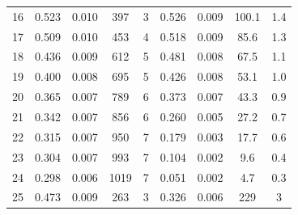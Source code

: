 \documentclass{article}
\begin{document}
{\begin{table}[H]
\begin{tabular}{@{}c|cc|cc||cc|cc@{}}
16 & 0.523  & 0.010   & 397          & 3              & 0.526 & 0.009   & 100.1        & 1.4            \\
17 & 0.509  & 0.010   & 453          & 4              & 0.518 & 0.009   & 85.6         & 1.3            \\
18 & 0.436  & 0.009   & 612          & 5              & 0.481 & 0.008   & 67.5         & 1.1            \\
19 & 0.400  & 0.008   & 695          & 5              & 0.426 & 0.008   & 53.1         & 1.0            \\
20 & 0.365  & 0.007   & 789          & 6              & 0.373 & 0.007   & 43.3         & 0.9            \\
21 & 0.342  & 0.007   & 856          & 6              & 0.260 & 0.005   & 27.2         & 0.7            \\
22 & 0.315  & 0.007   & 950          & 7              & 0.179 & 0.003   & 17.7         & 0.6            \\
23 & 0.304  & 0.007   & 993          & 7              & 0.104 & 0.002   & 9.6          & 0.4            \\
24 & 0.298  & 0.006   & 1019         & 7              & 0.051 & 0.002   & 4.7          & 0.3            \\
25 & 0.473  & 0.009   & 263          & 3              & 0.326 & 0.006   & 229        & 3         \\ \bottomrule  
\end{tabular}


\end{table}}
\end{document}
